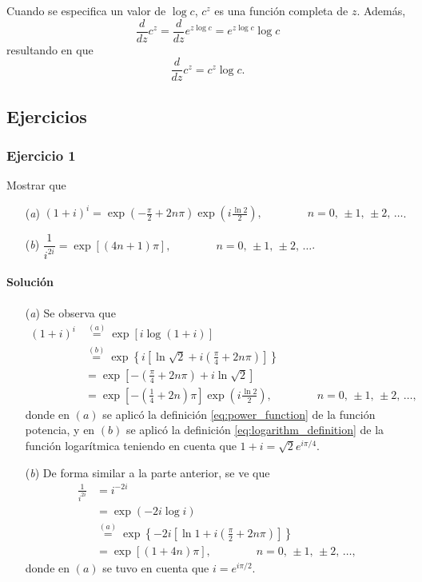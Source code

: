 \documentclass[a4paper]{report}
\begin{document}
Cuando se especifica un valor de \(\log c\), \(c^z\) es una función completa de \(z\). Además,
\[
 \frac{d}{dz}c^z=\frac{d}{dz}e^{z\log c}=e^{z\log c}\log c
\]
resultando en que 
\begin{equation}\label{eq:power_constant_derivative}
 \frac{d}{dz}c^z=c^z\log c. 
\end{equation}

\subsection*{Ejercicios}

\subsubsection{Ejercicio 1}

Mostrar que 
\begin{enumerate}
 \item[(\textit{a})] \(\displaystyle (1+i)^i=\exp\left(-\frac{\pi}{2}+2n\pi\right)\exp\left(i\frac{\ln2}{2}\right),\qquad\qquad n=0,\,\pm1,\,\pm2,\,\dots\). 
 \item[(\textit{b})] \(\displaystyle \dfrac{1}{i^{2i}}=\exp[(4n+1)\pi],\qquad\qquad n=0,\,\pm1,\,\pm2,\,\dots\). 
\end{enumerate}

\paragraph{Solución} 

\begin{enumerate}
 \item[(\textit{a})] Se observa que 
 \begin{align*}
  (1+i)^i&\overset{(a)}{=}\exp\left[i\log(1+i)\right]\\
   &\overset{(b)}{=}\exp\left\{i\left[\ln\sqrt{2}+i\left(\frac{\pi}{4}+2n\pi\right)\right]\right\}\\
   &=\exp\left[-\left(\frac{\pi}{4}+2n\pi\right)+i\ln\sqrt{2}\right]\\
   &=\exp\left[-\left(\frac{1}{4}+2n\right)\pi\right]\exp\left(i\frac{\ln2}{2}\right),
   \qquad\qquad n=0,\,\pm1,\,\pm2,\,\dots,
 \end{align*}
 donde en \((a)\) se aplicó la definición \ref{eq:power_function} de la función potencia, y en \((b)\) se aplicó la definición \ref{eq:logarithm_definition} de la función logarítmica teniendo en cuenta que \(1+i=\sqrt{2}e^{i\pi/4}\). 
 \item[(\textit{b})] De forma similar a la parte anterior, se ve que
 \begin{align*}
  \frac{1}{i^{2i}}&=i^{-2i}\\
   &=\exp\left(-2i\log i\right)\\
   &\overset{(a)}{=}\exp\left\{-2i\left[\ln1+i\left(\frac{\pi}{2}+2n\pi\right)\right]\right\}\\
   &=\exp\left[(1+4n)\pi\right],
   \qquad\qquad n=0,\,\pm1,\,\pm2,\,\dots,
 \end{align*}
 donde en \((a)\) se tuvo en cuenta que \(i=e^{i\pi/2}\).
\end{enumerate}
\end{document}
